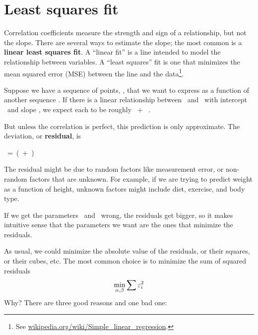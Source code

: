 \documentclass[12pt]{book}
\begin{document}
\section{Least squares fit}


Correlation coefficients measure the strength and sign of a
relationship, but not the slope.  There are several ways to estimate
the slope; the most common is a {\bf linear least squares fit}.  A
``linear fit'' is a line intended to model the relationship between
variables.  A ``least squares'' fit is one that minimizes the mean
squared error (MSE) between the line and the data\footnote{See
  \url{wikipedia.org/wiki/Simple_linear_regression}.}.

Suppose we have a sequence of points, \Y, that we want to express as a
function of another sequence \X.  If there is a linear relationship
between \X~and \Y~with intercept \myinter~and slope \myslope, we
expect each \y{} to be roughly \myinter~+ \myslope~\x{}.

But unless the correlation is perfect, this prediction is only
approximate.  The deviation, or {\bf residual}, is 

\quad \myeps{}~=~(\myinter~+~\myslope \x{})~\minus~\y{}

The residual might be due to random factors like measurement error,
or non-random factors that are unknown.  For example, if we are
trying to predict weight as a function of height, unknown factors
might include diet, exercise, and body type.

If we get the parameters \myinter~and \myslope~wrong, the residuals
get bigger, so it makes intuitive sense that the parameters we want
are the ones that minimize the residuals.

As usual, we could minimize the absolute value of the
residuals, or their squares, or their cubes, etc.  The most common
choice is to minimize the sum of squared residuals
%
\[ \min_{\alpha, \beta} \sum \varepsilon_i^2 \]
%
Why?  There are three good reasons and one bad one:
\end{document}
